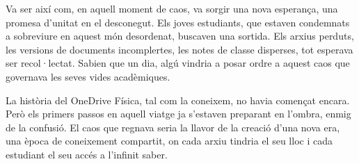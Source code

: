 Va ser així com, en aquell moment de caos, va sorgir una nova esperança, una promesa d'unitat en el desconegut. Els joves estudiants, que estaven condemnats a sobreviure en aquest món desordenat, buscaven una sortida. Els arxius perduts, les versions de documents incomplertes, les notes de classe disperses, tot esperava ser recol·lectat. Sabien que un dia, algú vindria a posar ordre a aquest caos que governava les seves vides acadèmiques.

La història del OneDrive Física, tal com la coneixem, no havia començat encara. Però els primers passos en aquell viatge ja s’estaven preparant en l’ombra, enmig de la confusió. El caos que regnava seria la llavor de la creació d'una nova era, una època de coneixement compartit, on cada arxiu tindria el seu lloc i cada estudiant el seu accés a l’infinit saber.
